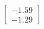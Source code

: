 \documentclass[preview]{standalone}
\begin{document}
\begin{align*}
\begin{bmatrix} -1.59 \\ -1.29 \end{bmatrix}
\end{align*}
\end{document}
